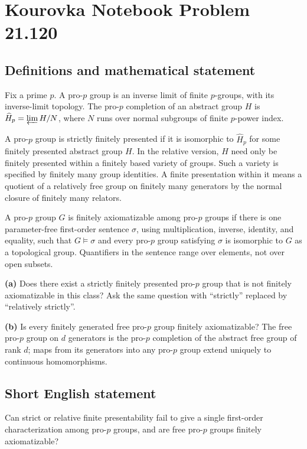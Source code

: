 \documentclass[11pt,a4paper]{article}
\begin{document}
\section*{Kourovka Notebook Problem 21.120}\label{statement}

\subsection{Definitions and mathematical statement}
Fix a prime $p$. A pro-$p$ group is an inverse limit of finite $p$-groups, with its inverse-limit topology. The pro-$p$ completion of an abstract group $H$ is $\widehat H_p=\varprojlim H/N$, where $N$ runs over normal subgroups of finite $p$-power index.

A pro-$p$ group is strictly finitely presented if it is isomorphic to $\widehat H_p$ for some finitely presented abstract group $H$. In the relative version, $H$ need only be finitely presented within a finitely based variety of groups. Such a variety is specified by finitely many group identities. A finite presentation within it means a quotient of a relatively free group on finitely many generators by the normal closure of finitely many relators.

A pro-$p$ group $G$ is finitely axiomatizable among pro-$p$ groups if there is one parameter-free first-order sentence $\sigma$, using multiplication, inverse, identity, and equality, such that $G\models\sigma$ and every pro-$p$ group satisfying $\sigma$ is isomorphic to $G$ as a topological group. Quantifiers in the sentence range over elements, not over open subsets.

\textbf{(a)} Does there exist a strictly finitely presented pro-$p$ group that is not finitely axiomatizable in this class? Ask the same question with ``strictly'' replaced by ``relatively strictly''.

\textbf{(b)} Is every finitely generated free pro-$p$ group finitely axiomatizable? The free pro-$p$ group on $d$ generators is the pro-$p$ completion of the abstract free group of rank $d$; maps from its generators into any pro-$p$ group extend uniquely to continuous homomorphisms.
\subsection{Short English statement}
Can strict or relative finite presentability fail to give a single first-order characterization among pro-$p$ groups, and are free pro-$p$ groups finitely axiomatizable?
\end{document}
